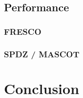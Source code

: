 \subsection{Performance}

\subsubsection{FRESCO}

\subsubsection{SPDZ / MASCOT}


\section{Conclusion}

\cite{cryptoeprint:2011:535}

\cite{cryptoeprint:2012:642}

\cite{GBW88}
